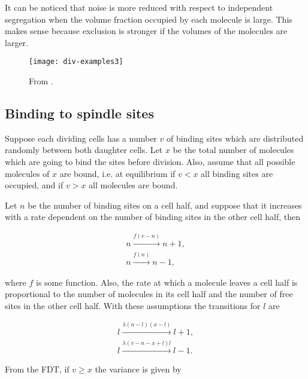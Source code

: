 It can be noticed that noise is more reduced with respect to independent segregation when the volume fraction occupied by each molecule is large. This makes sense because exclusion is stronger if the volumes of the molecules are larger.


\begin{figure}[H]
  \centering
  \texttt{[image: div-examples3]}
  \caption[FILL]{\label{fig:div-examples3} From \cite{pedraza08}.}
\end{figure}

\subsection{Binding to spindle sites}

Suppose each dividing cells has a number $v$ of binding sites which are distributed randomly between both daughter cells. Let $x$ be the total number of molecules which are going to bind the sites before division. Also, assume that all possible molecules of $x$ are bound, i.e. at equilibrium if $v<x$ all binding sites are occupied, and if $v>x$ all molecules are bound.

Let $n$ be the number of binding sites on a cell half, and suppose that it increases with a rate dependent on the number of binding sites in the other cell half, then

\begin{equation*}
  \begin{split}
    n\xrightarrow{f(v-n)}n+1,\\
    n\xrightarrow{f(n)}n-1,
  \end{split}
\end{equation*}

where $f$ is some function. Also, the rate at which a molecule leaves a cell half is proportional to the number of molecules in its cell half and the number of free sites in the other cell half. With these assumptions the transitions for $l$ are

\begin{equation*}
  \begin{split}
    l\xrightarrow{\lambda(n-l)(x-l)}l+1,\\
    l\xrightarrow{\lambda(v-n-x+l)l}l-1.
  \end{split}
\end{equation*}

From the FDT, if $v\geq x$ the variance is given by

